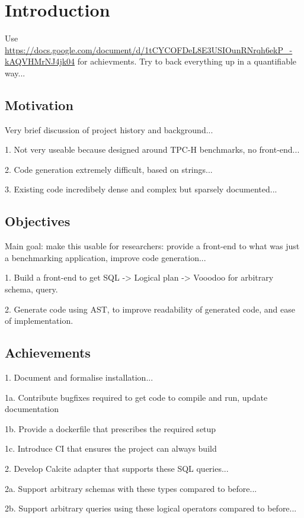 \chapter{Introduction}

Use \url{https://docs.google.com/document/d/1tCYCOFDeL8E3USIOunRNrqh6ekP_-kAQVHMrNJ4jk04} for achievments. Try to back everything up in a quantifiable way...

\section{Motivation}

Very brief discussion of project history and background...

1. Not very useable because designed around TPC-H benchmarks, no front-end...

2. Code generation extremely difficult, based on strings...

3. Existing code incredibely dense and complex but sparsely documented...

\section{Objectives}

Main goal: make this usable for researchers: provide a front-end to what was just a benchmarking application, improve code generation...

1. Build a front-end to get SQL -> Logical plan -> Vooodoo for arbitrary schema, query.

2. Generate code using AST, to improve readability of generated code, and ease of implementation.

\section{Achievements}

1. Document and formalise installation...

1a. Contribute bugfixes required to get code to compile and run, update documentation

1b. Provide a dockerfile that prescribes the required setup

1c. Introduce CI that ensures the project can always build

2. Develop Calcite adapter that supports these SQL queries...

2a. Support arbitrary schemas with these types compared to before...

2b. Support arbitrary queries using these logical operators compared to before...

